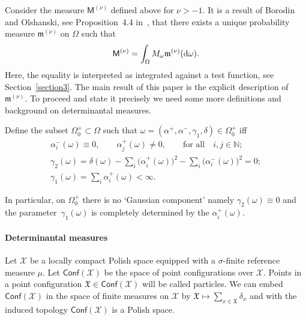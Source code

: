 Consider the measure $\mathsf{M}^{(\nu)}$ defined above for $\nu >-1$. It is a result of Borodin and Olshanski, see Proposition~4.4 in~\cite{BorodinOlshanskiErgodic}, that there exists a unique probability measure $\mathfrak{m}^{(\nu)}$ on $\Omega$ such that
\begin{gather*}
\mathsf{M}^{(\nu)}=\int_{\Omega}^{}M_{\omega}\mathfrak{m}^{(\nu)}({\rm d}\omega).
\end{gather*}
Here, the equality is interpreted as integrated against a test function, see Section~\ref{section3}.
The main result of this paper is the explicit description of~$\mathfrak{m}^{(\nu)}$. To proceed and state it precisely we need some more definitions and background on determinantal measures.

\begin{Definition} Define the subset $\Omega_0^+ \subset \Omega$ such that $\omega=\left(\alpha^+,\alpha^-, \gamma_1, \delta\right) \in \Omega_0^+$ iff
\begin{gather*}
\alpha_i^{-}(\omega) \equiv 0, \qquad \alpha_j^{+}(\omega) \neq 0, \qquad \text{for all} \quad i,j \in \mathbb{N};\\
\gamma_2(\omega) =\delta(\omega)-\sum_{i}^{}\big(\alpha_i^+(\omega)\big)^2-\sum_{i}^{}\big(\alpha_i^-(\omega)\big)^2=0;\\
\gamma_1(\omega) = \sum_{i }^{}\alpha_i^{+}(\omega)<\infty.
\end{gather*}
\end{Definition}
In particular, on $\Omega_0^+$ there is no `Gaussian component' namely $\gamma_2(\omega)\equiv 0$ and the para\-me\-ter~$\gamma_1(\omega)$ is completely determined by the $\alpha_i^+(\omega)$.

\paragraph{Determinantal measures}
Let $\mathcal{X}$ be a locally compact Polish space equipped with a $\sigma$-finite reference measure $\mu$. Let $\mathsf{Conf}(\mathcal{X})$ be the space of point configurations over $\mathcal{X}$. Points in a point configuration $\mathfrak{X} \in \mathsf{Conf}(\mathcal{X})$ will be called particles. We can embed $\mathsf{Conf}(\mathcal{X})$ in the space of finite measures on $\mathcal{X}$ by $\mathfrak{X}\mapsto \sum\limits_{x \in \mathfrak{X}}^{}\delta_x$ and with the induced topology $\mathsf{Conf}(\mathcal{X})$ is a Polish space.

